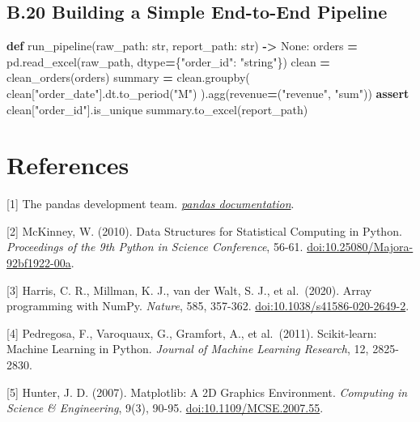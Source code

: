\documentclass[
  12pt,
]{article}
\newenvironment{Shaded}{\begin{snugshade}}{\end{snugshade}}
\newcommand{\BuiltInTok}[1]{#1}
\newcommand{\ControlFlowTok}[1]{\textcolor[rgb]{0.13,0.29,0.53}{\textbf{#1}}}
\newcommand{\KeywordTok}[1]{\textcolor[rgb]{0.13,0.29,0.53}{\textbf{#1}}}
\newcommand{\NormalTok}[1]{#1}
\newcommand{\OperatorTok}[1]{\textcolor[rgb]{0.81,0.36,0.00}{\textbf{#1}}}
\newcommand{\StringTok}[1]{\textcolor[rgb]{0.31,0.60,0.02}{#1}}
\newcommand{\VariableTok}[1]{\textcolor[rgb]{0.00,0.00,0.00}{#1}}
\begin{document}
\subsection{B.20 Building a Simple End-to-End
Pipeline}\label{b.20-building-a-simple-end-to-end-pipeline}

\begin{Shaded}
\begin{Highlighting}[]
\KeywordTok{def}\NormalTok{ run\_pipeline(raw\_path: }\BuiltInTok{str}\NormalTok{, report\_path: }\BuiltInTok{str}\NormalTok{) }\OperatorTok{{-}\textgreater{}} \VariableTok{None}\NormalTok{:}
\NormalTok{    orders }\OperatorTok{=}\NormalTok{ pd.read\_excel(raw\_path, dtype}\OperatorTok{=}\NormalTok{\{}\StringTok{"order\_id"}\NormalTok{: }\StringTok{"string"}\NormalTok{\})}
\NormalTok{    clean }\OperatorTok{=}\NormalTok{ clean\_orders(orders)}
\NormalTok{    summary }\OperatorTok{=}\NormalTok{ clean.groupby(}
\NormalTok{        clean[}\StringTok{"order\_date"}\NormalTok{].dt.to\_period(}\StringTok{"M"}\NormalTok{)}
\NormalTok{    ).agg(revenue}\OperatorTok{=}\NormalTok{(}\StringTok{"revenue"}\NormalTok{, }\StringTok{"sum"}\NormalTok{))}
    \ControlFlowTok{assert}\NormalTok{ clean[}\StringTok{"order\_id"}\NormalTok{].is\_unique}
\NormalTok{    summary.to\_excel(report\_path)}
\end{Highlighting}
\end{Shaded}

\section{References}\label{references}

{[}1{]} The pandas development team.
\href{https://pandas.pydata.org/docs/}{\emph{pandas documentation}}.

{[}2{]} McKinney, W. (2010). Data Structures for Statistical Computing
in Python. \emph{Proceedings of the 9th Python in Science Conference},
56-61.
\href{https://doi.org/10.25080/Majora-92bf1922-00a}{doi:10.25080/Majora-92bf1922-00a}.

{[}3{]} Harris, C. R., Millman, K. J., van der Walt, S. J., et
al.~(2020). Array programming with NumPy. \emph{Nature}, 585, 357-362.
\href{https://doi.org/10.1038/s41586-020-2649-2}{doi:10.1038/s41586-020-2649-2}.

{[}4{]} Pedregosa, F., Varoquaux, G., Gramfort, A., et al.~(2011).
Scikit-learn: Machine Learning in Python. \emph{Journal of Machine
Learning Research}, 12, 2825-2830.

{[}5{]} Hunter, J. D. (2007). Matplotlib: A 2D Graphics Environment.
\emph{Computing in Science \& Engineering}, 9(3), 90-95.
\href{https://doi.org/10.1109/MCSE.2007.55}{doi:10.1109/MCSE.2007.55}.
\end{document}

